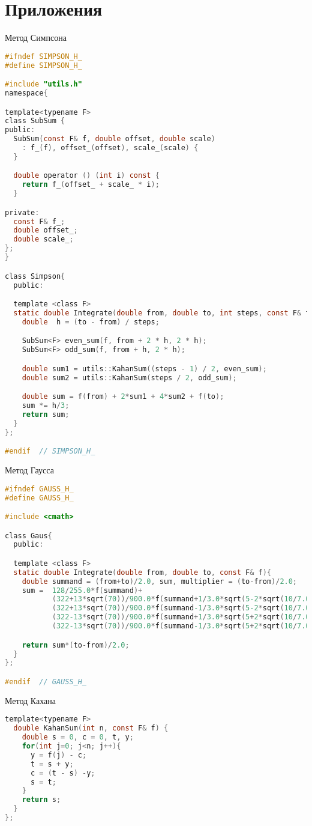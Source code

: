 \chapter*{Приложения}

Метод Симпсона
\begin{lstlisting}[language=C]
#ifndef SIMPSON_H_
#define SIMPSON_H_

#include "utils.h"
namespace{

template<typename F>
class SubSum {
public:
  SubSum(const F& f, double offset, double scale)
    : f_(f), offset_(offset), scale_(scale) {
  }

  double operator () (int i) const {
    return f_(offset_ + scale_ * i);
  }

private:
  const F& f_;
  double offset_;
  double scale_;
};
}

class Simpson{
  public:

  template <class F>
  static double Integrate(double from, double to, int steps, const F& f){
    double  h = (to - from) / steps;

    SubSum<F> even_sum(f, from + 2 * h, 2 * h);
    SubSum<F> odd_sum(f, from + h, 2 * h);

    double sum1 = utils::KahanSum((steps - 1) / 2, even_sum);
    double sum2 = utils::KahanSum(steps / 2, odd_sum);

    double sum = f(from) + 2*sum1 + 4*sum2 + f(to);
    sum *= h/3;
    return sum;
  }
};

#endif  // SIMPSON_H_

\end{lstlisting}

Метод Гаусса
\begin{lstlisting}[language=C]
#ifndef GAUSS_H_
#define GAUSS_H_

#include <cmath>

class Gaus{
  public:

  template <class F>
  static double Integrate(double from, double to, const F& f){
    double summand = (from+to)/2.0, sum, multiplier = (to-from)/2.0;
    sum =  128/255.0*f(summand)+
           (322+13*sqrt(70))/900.0*f(summand+1/3.0*sqrt(5-2*sqrt(10/7.0)))*multiplier +
           (322+13*sqrt(70))/900.0*f(summand-1/3.0*sqrt(5-2*sqrt(10/7.0)))*multiplier +
           (322-13*sqrt(70))/900.0*f(summand+1/3.0*sqrt(5+2*sqrt(10/7.0)))*multiplier +
           (322-13*sqrt(70))/900.0*f(summand-1/3.0*sqrt(5+2*sqrt(10/7.0)))*multiplier;

    return sum*(to-from)/2.0;
  }
};

#endif  // GAUSS_H_
\end{lstlisting}

Метод Кахана
\begin{lstlisting}[language=C]
  template<typename F>
  double KahanSum(int n, const F& f) {
    double s = 0, c = 0, t, y;
    for(int j=0; j<n; j++){
      y = f(j) - c;
      t = s + y;
      c = (t - s) -y;
      s = t;
    }
    return s;
  }
};

\end{lstlisting}
